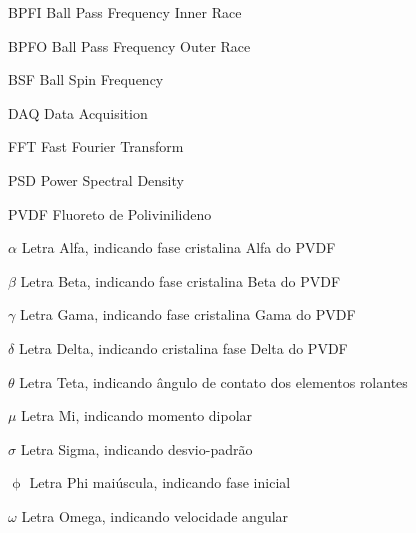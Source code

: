\documentclass[
	12pt,				
	oneside,			
	a4paper,			
	english,			
	brazil,	
	sumario=abnt-6027-2012		
	]{abntex2ppgsi}
\begin{document}
\listoffigures*
\cleardoublepage
\listoftables*
\cleardoublepage




%
%
\begin{siglas}
  \item[BPFI] Ball Pass Frequency Inner Race
  \item[BPFO] Ball Pass Frequency Outer Race
  \item[BSF] Ball Spin Frequency 
  \item[DAQ] Data Acquisition
  \item[FFT] Fast Fourier Transform
  \item[PSD] Power Spectral Density
  \item[PVDF] Fluoreto de Polivinilideno
\end{siglas}


\begin{simbolos}
  \item[$ \alpha $] Letra Alfa, indicando fase cristalina Alfa do PVDF
  \item[$ \beta $] Letra Beta, indicando fase cristalina Beta do PVDF
  \item[$ \gamma $] Letra Gama, indicando fase cristalina Gama do PVDF
  \item[$ \delta $] Letra Delta, indicando cristalina fase Delta do PVDF
  \item[$ \theta $] Letra Teta, indicando ângulo de contato dos elementos rolantes
  \item[$ \mu $] Letra Mi, indicando momento dipolar 
  \item[$ \sigma $] Letra Sigma, indicando desvio-padrão
  \item[$ \upphi $] Letra Phi maiúscula, indicando fase inicial
  \item[$ \omega $] Letra Omega, indicando velocidade angular 
\end{simbolos}
\end{document}

